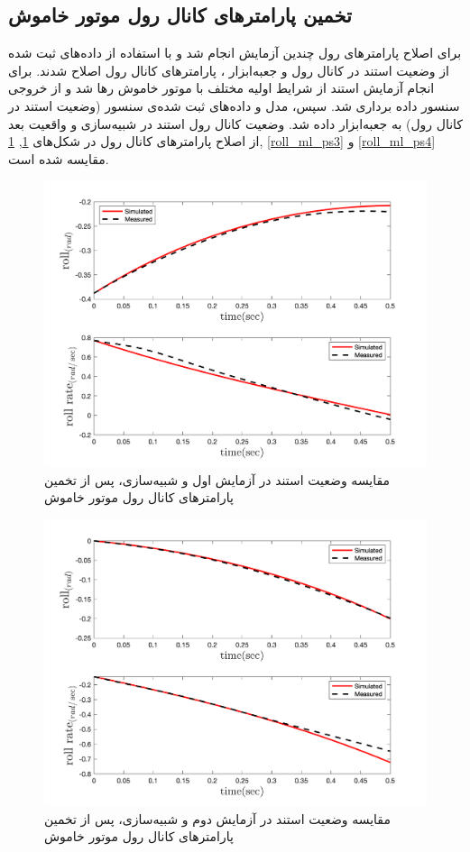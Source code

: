 \subsection{تخمین پارامترهای کانال رول موتور خاموش}
برای اصلاح پارامترهای رول چندین آزمایش انجام شد و با استفاده از داده‌های ثبت شده از وضعیت استند در کانال رول و جعبه‌ابزار
،
پارامترهای کانال رول اصلاح شدند.
برای انجام آزمایش استند از شرایط اولیه مختلف با موتور خاموش رها شد  و از خروجی سنسور داده برداری شد. سپس، مدل و داده‌های ثبت شده‌ی سنسور (وضعیت استند در کانال رول) به جعبه‌ابزار
داده شد. وضعیت کانال رول استند در شبیه‌سازی و واقعیت بعد از اصلاح پارامترهای کانال رول در شکل‌های
\ref{roll_ml_ps1}, \ref{roll_ml_ps1}, \ref{roll_ml_ps3} و \ref{roll_ml_ps4}
مقایسه شده است.

\begin{figure}[H]
	\includegraphics[width=12cm]{../Figures/RCP/roll_ml_parameter_estimation/RCP_roll_S1.png}
	\centering
	\caption{مقايسه وضعیت استند در  آزمايش اول و شبیه‌سازی، پس از تخمین پارامترهای کانال رول موتور خاموش}
	\label{roll_ml_ps1}
\end{figure}
\begin{figure}[H]
	\includegraphics[width=12cm]{../Figures/RCP/roll_ml_parameter_estimation/RCP_roll_S2.png}
	\centering
	\caption{مقايسه وضعیت استند در  آزمايش دوم و شبیه‌سازی، پس از تخمین پارامترهای کانال رول موتور خاموش}
	\label{roll_ml_ps2}
\end{figure}
